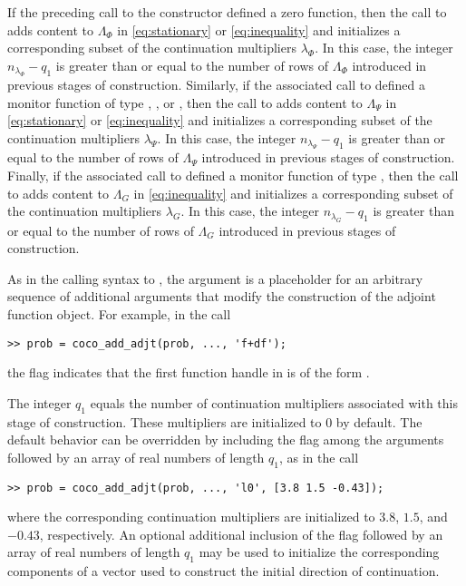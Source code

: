 If the preceding call to the  constructor defined a zero function, then the call to  adds content to $\Lambda_\Phi$ in \eqref{eq:stationary} or \eqref{eq:inequality} and initializes a corresponding subset of the continuation multipliers $\lambda_\Phi$. In this case, the integer $n_{\lambda_\Phi}-q_1$ is greater than or equal to the number of rows of $\Lambda_\Phi$ introduced in previous stages of construction. Similarly, if the associated call to  defined a monitor function of type , , or , then the call to  adds content to $\Lambda_\Psi$ in \eqref{eq:stationary} or \eqref{eq:inequality} and initializes a corresponding subset of the continuation multipliers $\lambda_\Psi$. In this case, the integer $n_{\lambda_\Psi}-q_1$ is greater than or equal to the number of rows of $\Lambda_\Psi$ introduced in previous stages of construction. Finally, if the associated call to  defined a monitor function of type , then the call to  adds content to $\Lambda_G$ in \eqref{eq:inequality} and initializes a corresponding subset of the continuation multipliers $\lambda_G$. In this case, the integer $n_{\lambda_G}-q_1$ is greater than or equal to the number of rows of $\Lambda_G$ introduced in previous stages of construction.

As in the calling syntax to , the  argument is a placeholder for an arbitrary sequence of additional arguments that modify the construction of the adjoint function object. For example, in the call
\begin{lstlisting}[language=coco-highlight]
>> prob = coco_add_adjt(prob, ..., 'f+df');
\end{lstlisting}
the flag  indicates that the first function handle in  is of the form . 

The integer $q_1$ equals the number of continuation multipliers associated with this stage of construction. These multipliers are initialized to $0$ by default. The default behavior can be overridden by including the flag  among the  arguments followed by an array of real numbers of length $q_1$, as in the call
\begin{lstlisting}[language=coco-highlight]
>> prob = coco_add_adjt(prob, ..., 'l0', [3.8 1.5 -0.43]);
\end{lstlisting}
where the corresponding continuation multipliers are initialized to $3.8$, $1.5$, and $-0.43$, respectively.
An optional additional inclusion of the flag  followed by an array of real numbers of length $q_1$ may be used to initialize the corresponding components of a vector used to construct the initial direction of continuation.


